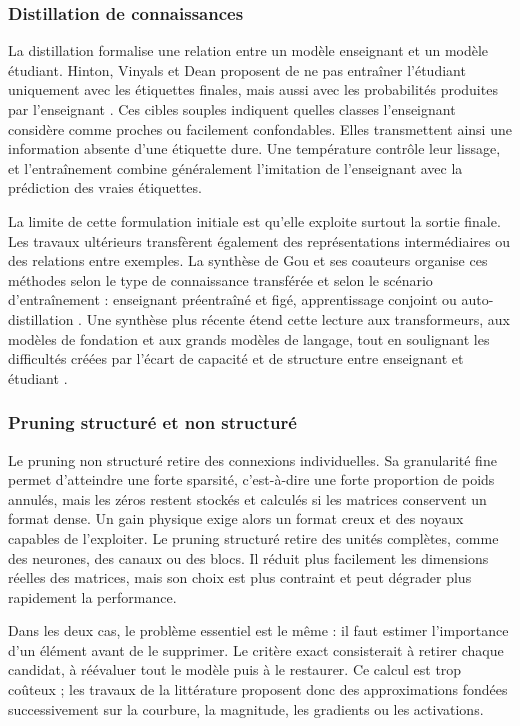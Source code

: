 \subsubsection{Distillation de connaissances}

La distillation formalise une relation entre un modèle enseignant et un modèle
étudiant. Hinton, Vinyals et Dean proposent de ne pas entraîner l'étudiant
uniquement avec les étiquettes finales, mais aussi avec les probabilités
produites par l'enseignant \cite{hinton2015distilling}. Ces cibles souples
indiquent quelles classes l'enseignant considère comme proches ou facilement
confondables. Elles transmettent ainsi une information absente d'une étiquette
dure. Une température contrôle leur lissage, et l'entraînement combine
généralement l'imitation de l'enseignant avec la prédiction des vraies
étiquettes.

La limite de cette formulation initiale est qu'elle exploite surtout la sortie
finale. Les travaux ultérieurs transfèrent également des représentations
intermédiaires ou des relations entre exemples. La synthèse de Gou et ses
coauteurs organise ces méthodes selon le type de connaissance transférée et
selon le scénario d'entraînement : enseignant préentraîné et figé, apprentissage
conjoint ou auto-distillation \cite{gou2021survey}. Une synthèse plus récente
étend cette lecture aux transformeurs, aux modèles de fondation et aux grands
modèles de langage, tout en soulignant les difficultés créées par l'écart de
capacité et de structure entre enseignant et étudiant
\cite{mansourian2025survey}.

\subsubsection{Pruning structuré et non structuré}

Le pruning non structuré retire des connexions individuelles. Sa granularité
fine permet d'atteindre une forte sparsité, c'est-à-dire une forte proportion de
poids annulés, mais les zéros restent stockés et calculés si les matrices
conservent un format dense. Un gain physique exige
alors un format creux et des noyaux capables de l'exploiter. Le pruning
structuré retire des unités complètes, comme des neurones, des canaux ou des
blocs. Il réduit plus facilement les dimensions réelles des matrices, mais son
choix est plus contraint et peut dégrader plus rapidement la performance.

Dans les deux cas, le problème essentiel est le même : il faut estimer
l'importance d'un élément avant de le supprimer. Le critère exact consisterait
à retirer chaque candidat, à réévaluer tout le modèle puis à le restaurer. Ce
calcul est trop coûteux ; les travaux de la littérature proposent donc des
approximations fondées successivement sur la courbure, la magnitude, les
gradients ou les activations.

